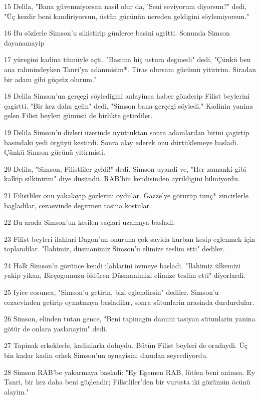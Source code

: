 \par 15 Delila, "Bana güvenmiyorsan nasil olur da, 'Seni seviyorum diyorsun?" dedi, "Üç kezdir beni kandiriyorsun, üstün gücünün nereden geldigini söylemiyorsun."
\par 16 Bu sözlerle Simson'u sikistirip günlerce basini agritti. Sonunda Simson dayanamayip
\par 17 yüregini kadina tümüyle açti. "Basima hiç ustura degmedi" dedi, "Çünkü ben ana rahmindeyken Tanri'ya adanmisim*. Tiras olursam gücümü yitiririm. Siradan bir adam gibi güçsüz olurum."
\par 18 Delila Simson'un gerçegi söyledigini anlayinca haber gönderip Filist beylerini çagirtti. "Bir kez daha gelin" dedi, "Simson bana gerçegi söyledi." Kadinin yanina gelen Filist beyleri gümüsü de birlikte getirdiler.
\par 19 Delila Simson'u dizleri üzerinde uyuttuktan sonra adamlardan birini çagirtip basindaki yedi örgüyü kestirdi. Sonra alay ederek onu dürtüklemeye basladi. Çünkü Simson gücünü yitirmisti.
\par 20 Delila, "Simson, Filistliler geldi!" dedi. Simson uyandi ve, "Her zamanki gibi kalkip silkinirim" diye düsündü. RAB'bin kendisinden ayrildigini bilmiyordu.
\par 21 Filistliler onu yakalayip gözlerini oydular. Gazze'ye götürüp tunç* zincirlerle bagladilar, cezaevinde degirmen tasina kostular.
\par 22 Bu arada Simson'un kesilen saçlari uzamaya basladi.
\par 23 Filist beyleri ilahlari Dagon'un onuruna çok sayida kurban kesip eglenmek için toplandilar. "Ilahimiz, düsmanimiz Simson'u elimize teslim etti" dediler.
\par 24 Halk Simson'u görünce kendi ilahlarini övmeye basladi. "Ilahimiz ülkemizi yakip yikan, Birçogumuzu öldüren Düsmanimizi elimize teslim etti" diyorlardi.
\par 25 Iyice cosunca, "Simson'u getirin, bizi eglendirsin" dediler. Simson'u cezaevinden getirip oynatmaya basladilar, sonra sütunlarin arasinda durdurdular.
\par 26 Simson, elinden tutan gence, "Beni tapinagin damini tasiyan sütunlarin yanina götür de onlara yaslanayim" dedi.
\par 27 Tapinak erkeklerle, kadinlarla doluydu. Bütün Filist beyleri de oradaydi. Üç bin kadar kadin erkek Simson'un oynayisini damdan seyrediyordu.
\par 28 Simson RAB'be yakarmaya basladi: "Ey Egemen RAB, lütfen beni animsa. Ey Tanri, bir kez daha beni güçlendir; Filistliler'den bir vurusta iki gözümün öcünü alayim."
